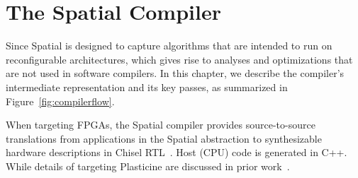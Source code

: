 \chapter{The Spatial Compiler}
\label{compiler}

Since Spatial is designed to capture algorithms that are intended to run on reconfigurable architectures,
which gives rise to analyses and optimizations that are not used in software compilers.
In this chapter, we describe the compiler's intermediate representation and its key passes, as summarized in Figure~\ref{fig:compilerflow}.

When targeting FPGAs, the Spatial compiler provides source-to-source translations from applications in the Spatial abstraction to synthesizable hardware descriptions in Chisel RTL~\cite{chisel}.
Host (CPU) code is generated in C++.
While
details of targeting Plasticine are discussed in prior work~\cite{plasticine}.




